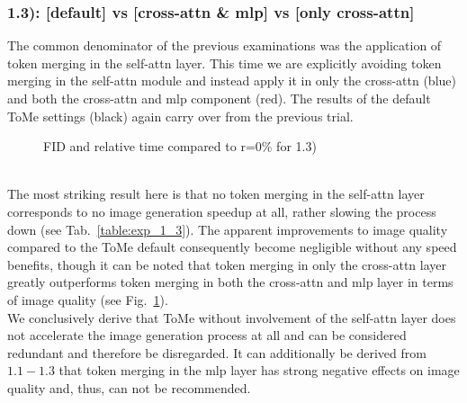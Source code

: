 \subsubsection*{1.3): [default] vs [cross-attn \& mlp] vs [only cross-attn]}
The common denominator of the previous examinations was the application of token merging in the self-attn layer. This time we are explicitly avoiding token merging in the self-attn module and instead apply it in only the cross-attn (blue) and both the cross-attn and mlp component (red).
The results of the default ToMe settings (black) again carry over from the previous trial.\\
\begin{figure}[!htb]
    
    
\caption{FID and relative time compared to r=0\% for 1.3)}
\label{fig:exp_1_3}
\end{figure}\\
The most striking result here is that no token merging in the self-attn layer corresponds to no image generation speedup at all, rather slowing the process down (see Tab.~\ref{table:exp_1_3}). 
The apparent improvements to image quality compared to the ToMe default consequently become negligible without any speed benefits, though it can be noted that token merging in only the cross-attn layer greatly outperforms token merging in both the cross-attn and mlp layer in terms of image quality (see Fig.~\ref{fig:exp_1_3}).\\
We conclusively derive that ToMe without involvement of the self-attn layer does not accelerate the image generation process at all and can be considered redundant and therefore be disregarded. It can additionally be derived from \(1.1 - 1.3\) that token merging in the mlp layer has strong negative effects on image quality and, thus, can not be recommended.



